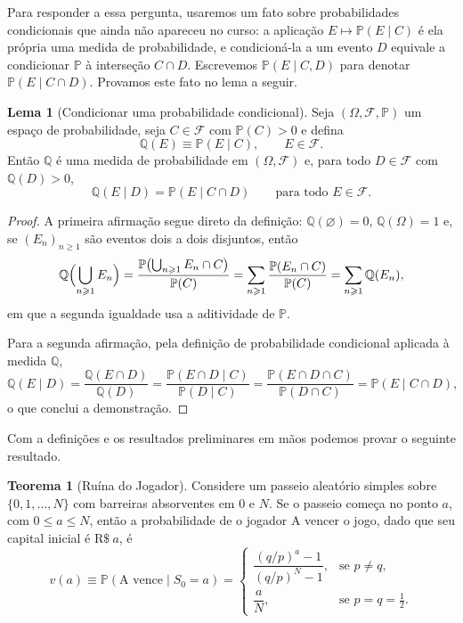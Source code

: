\documentclass[12pt,portuguese]{article}
\theoremstyle{definition}
\newtheorem{theorem}{Teorema}
\newtheorem{lemma}[lemma]{Lema}
\theoremstyle{plainexercise}
\theoremstyle{starredexercise}
\theoremstyle{definition}
\begin{document}
Para responder a essa pergunta, usaremos um fato sobre probabilidades
condicionais que ainda não apareceu no curso: a aplicação
$E \mapsto \mathbb{P}(E \mid C)$ é ela própria uma medida de probabilidade, e
condicioná-la a um evento $D$ equivale a condicionar $\mathbb{P}$ à interseção
$C \cap D$. Escrevemos $\mathbb{P}(E \mid C, D)$ para denotar
$\mathbb{P}(E \mid C \cap D)$. Provamos este fato no lema a seguir.

\begin{lemma}[Condicionar uma probabilidade condicional]\label{lem:condicional}
  Seja $(\Omega, \mathcal{F}, \mathbb{P})$ um espaço de probabilidade, seja
  $C \in \mathcal{F}$ com $\mathbb{P}(C) > 0$ e defina
  \[
    \mathbb{Q}(E) \equiv \mathbb{P}(E \mid C), \qquad E \in \mathcal{F}.
  \]
  Então $\mathbb{Q}$ é uma medida de probabilidade em $(\Omega, \mathcal{F})$
  e, para todo $D \in \mathcal{F}$ com $\mathbb{Q}(D) > 0$,
  \[
    \mathbb{Q}(E \mid D) = \mathbb{P}(E \mid C \cap D)
    \qquad \text{para todo } E \in \mathcal{F}.
  \]
\end{lemma}

\begin{proof}
  A primeira afirmação segue direto da definição: $\mathbb{Q}(\varnothing) = 0$,
  $\mathbb{Q}(\Omega) = 1$ e, se $(E_n)_{n \geqslant 1}$ são eventos dois a
  dois disjuntos, então
  \[
    \mathbb{Q}\Bigl(\bigcup_{n \geqslant 1} E_n\Bigr)
    = \frac{\mathbb{P}\bigl(\bigcup_{n \geqslant 1} E_n \cap C\bigr)}{\mathbb{P}(C)}
    = \sum_{n \geqslant 1} \frac{\mathbb{P}(E_n \cap C)}{\mathbb{P}(C)}
    = \sum_{n \geqslant 1} \mathbb{Q}(E_n),
  \]
  em que a segunda igualdade usa a aditividade de $\mathbb{P}$.

  Para a segunda afirmação, pela definição de probabilidade condicional
  aplicada à medida $\mathbb{Q}$,
  \[
    \mathbb{Q}(E \mid D)
    = \frac{\mathbb{Q}(E \cap D)}{\mathbb{Q}(D)}
    = \frac{\mathbb{P}(E \cap D \mid C)}{\mathbb{P}(D \mid C)}
    = \frac{\mathbb{P}(E \cap D \cap C)}{\mathbb{P}(D \cap C)}
    = \mathbb{P}(E \mid C \cap D),
  \]
  o que conclui a demonstração.
\end{proof}

Com a definições e os resultados preliminares em mãos podemos provar o seguinte
resultado.

\begin{theorem}[Ruína do Jogador]\label{thm:ruina-probabilidade}
  Considere um passeio aleatório simples sobre $\{0, 1, \ldots, N\}$ com
  barreiras absorventes em $0$ e $N$. Se o passeio começa no ponto $a$, com
  $0 \leqslant a \leqslant N$, então a probabilidade de o jogador A vencer o
  jogo, dado que seu capital inicial é $\mathrm{R\$}~a$, é
  \begin{equation}\label{eq:ruina-v}
    v(a) \equiv \mathbb{P}(\text{A vence} \mid S_0 = a) =
    \begin{cases}
      \dfrac{(q/p)^a - 1}{(q/p)^N - 1}, & \text{se } p \neq q, \\[0.35cm]
      \dfrac{a}{N}, & \text{se } p = q = \tfrac{1}{2}.
    \end{cases}
  \end{equation}
\end{theorem}
\end{document}
